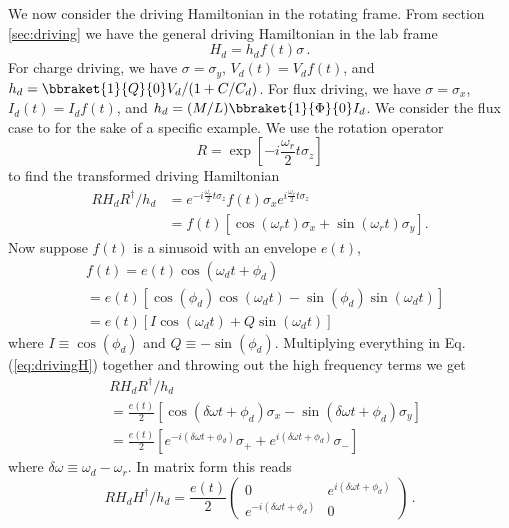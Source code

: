 We now consider the driving Hamiltonian in the rotating frame.
From section \ref{sec:driving} we have the general driving Hamiltonian in the lab frame
\begin{equation}
H_d = h_d f(t) \sigma \, .
\end{equation}
For charge driving, we have $\sigma = \sigma_y$, $V_d(t) = V_d f(t)$, and $h_d = \bbraket{1}{Q}{0} V_d/(1 + C/C_d)$.
For flux driving, we have $\sigma = \sigma_x$, $I_d(t) = I_d f(t)$, and $h_d = (M/L) \bbraket{1}{\Phi}{0} I_d$.
We consider the flux case to for the sake of a specific example.
We use the rotation operator \begin{equation}
R = \exp \left[ -i \frac{\omega_r}{2} t \sigma_z \right] \end{equation}
to find the transformed driving Hamiltonian \begin{align}
RH_d R^{\dagger}/h_d
&= e^{-i \frac{\omega_r}{2} t \sigma_z} f(t)\sigma_x e^{i \frac{\omega_r}{2} t \sigma_z} \nonumber \\
&= f(t)\left[ \cos\left(\omega_r t\right)\sigma_x + \sin\left(\omega_r t\right)\sigma_y \right]. \label{eq:drivingH}
\end{align}
Now suppose $f(t)$ is a sinusoid with an envelope $e(t)$,
\begin{align}
& f(t)
= e(t)\cos \left( \omega_d t + \phi_d \right) \\
&= e(t) \left[ \cos \left( \phi_d \right) \cos \left( \omega_d t \right) - \sin \left( \phi_d \right) \sin \left( \omega_d t \right) \right] \\
&= e(t) \left[ I \cos\left(\omega_d t\right) + Q \sin \left(\omega_d t\right) \right] \label{eq:drivingFunctionIQ}
\end{align}
where $I \equiv \cos(\phi_d)$ and $Q \equiv - \sin(\phi_d)$.
Multiplying everything in Eq. (\ref{eq:drivingH}) together and throwing out the high frequency terms we get
\begin{align}
& RH_dR^{\dagger}/h_d \\
&= \frac{e(t)}{2} \left[ \cos(\delta\omega t + \phi_d)\sigma_x - \sin(\delta\omega t + \phi_d)\sigma_y \right] \\
&= \frac{e(t)}{2} \left[ e^{-i(\delta \omega t + \phi_d)} \sigma_+ + e^{i(\delta \omega t + \phi_d)} \sigma_- \right]
\end{align}
where $\delta\omega \equiv \omega_d - \omega_r$. In matrix form this reads
\begin{equation}
RH_dH^{\dagger}/h_d = \frac{e(t)}{2} \left( \begin{array}{cc} 0 & e^{i(\delta\omega t + \phi_d)} \\ e^{-i(\delta\omega t + \phi_d)} & 0 \end{array}\right) \, . \label{eq:drivingH_matrixForm}
\end{equation}
